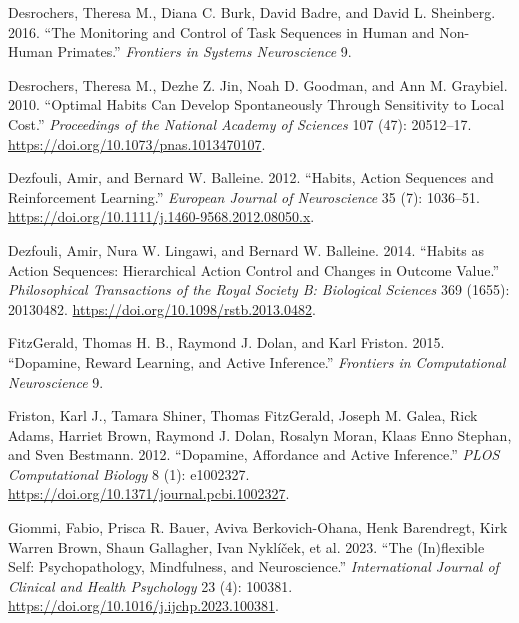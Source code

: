 \documentclass{article}
\newlength{\cslhangindent}
\newlength{\cslentryspacingunit} %
\newenvironment{CSLReferences}[2] %
 {%
  \setlength{\parindent}{0pt}
  \ifodd #1
  \let\oldpar\par
  \def\par{\hangindent=\cslhangindent\oldpar}
  \fi
  \setlength{\parskip}{#2\cslentryspacingunit}
 }%
 {}
\begin{document}
\begin{CSLReferences}{1}{0}
\leavevmode{}%
Desrochers, Theresa M., Diana C. Burk, David Badre, and David L.
Sheinberg. 2016. {``The {Monitoring} and {Control} of {Task Sequences}
in {Human} and {Non-Human Primates}.''} \emph{Frontiers in Systems
Neuroscience} 9.

\leavevmode{}%
Desrochers, Theresa M., Dezhe Z. Jin, Noah D. Goodman, and Ann M.
Graybiel. 2010. {``Optimal Habits Can Develop Spontaneously Through
Sensitivity to Local Cost.''} \emph{Proceedings of the National Academy
of Sciences} 107 (47): 20512--17.
\url{https://doi.org/10.1073/pnas.1013470107}.

\leavevmode{}%
Dezfouli, Amir, and Bernard W. Balleine. 2012. {``Habits, Action
Sequences and Reinforcement Learning.''} \emph{European Journal of
Neuroscience} 35 (7): 1036--51.
\url{https://doi.org/10.1111/j.1460-9568.2012.08050.x}.

\leavevmode{}%
Dezfouli, Amir, Nura W. Lingawi, and Bernard W. Balleine. 2014.
{``Habits as Action Sequences: Hierarchical Action Control and Changes
in Outcome Value.''} \emph{Philosophical Transactions of the Royal
Society B: Biological Sciences} 369 (1655): 20130482.
\url{https://doi.org/10.1098/rstb.2013.0482}.

\leavevmode{}%
FitzGerald, Thomas H. B., Raymond J. Dolan, and Karl Friston. 2015.
{``Dopamine, Reward Learning, and Active Inference.''} \emph{Frontiers
in Computational Neuroscience} 9.

\leavevmode{}%
Friston, Karl J., Tamara Shiner, Thomas FitzGerald, Joseph M. Galea,
Rick Adams, Harriet Brown, Raymond J. Dolan, Rosalyn Moran, Klaas Enno
Stephan, and Sven Bestmann. 2012. {``Dopamine, {Affordance} and {Active
Inference}.''} \emph{PLOS Computational Biology} 8 (1): e1002327.
\url{https://doi.org/10.1371/journal.pcbi.1002327}.

\leavevmode{}%
Giommi, Fabio, Prisca R. Bauer, Aviva Berkovich-Ohana, Henk Barendregt,
Kirk Warren Brown, Shaun Gallagher, Ivan Nyklíček, et al. 2023. {``The
({In})flexible Self: {Psychopathology}, Mindfulness, and
Neuroscience.''} \emph{International Journal of Clinical and Health
Psychology} 23 (4): 100381.
\url{https://doi.org/10.1016/j.ijchp.2023.100381}.


\end{CSLReferences}
\end{document}
